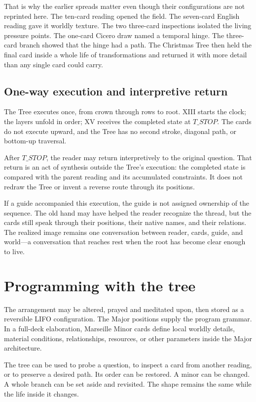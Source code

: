 That is why the earlier spreads matter even though their configurations are not
reprinted here. The ten-card reading opened the field. The seven-card English
reading gave it worldly texture. The two three-card inspections isolated the
living pressure points. The one-card Cicero draw named a temporal hinge. The
three-card branch showed that the hinge had a path. The Christmas Tree then
held the final card inside a whole life of transformations and returned it with
more detail than any single card could carry.

\subsection{One-way execution and interpretive return}

The Tree executes once, from crown through rows to root. XIII starts the clock;
the layers unfold in order; XV receives the completed state at $T\_STOP$. The
cards do not execute upward, and the Tree has no second stroke, diagonal path,
or bottom-up traversal.

After $T\_STOP$, the reader may return interpretively to the original question.
That return is an act of synthesis outside the Tree's execution: the completed
state is compared with the parent reading and its accumulated constraints. It
does not redraw the Tree or invent a reverse route through its positions.

If a guide accompanied this execution, the guide is not assigned ownership of
the sequence. The old hand may have helped the reader recognize the thread, but
the cards still speak through their positions, their native names, and their
relations. The realized image remains one conversation between reader, cards,
guide, and world—a conversation that reaches rest when the root has become
clear enough to live.

\section{Programming with the tree}

The arrangement may be altered, prayed and meditated upon, then stored as a
reversible LIFO configuration. The Major positions supply the program grammar.
In a full-deck elaboration, Marseille Minor cards define local worldly details,
material conditions, relationships, resources, or other parameters inside the
Major architecture.

The tree can be used to probe a question, to inspect a card from another
reading, or to preserve a desired path. Its order can be restored. A minor can
be changed. A whole branch can be set aside and revisited. The shape remains
the same while the life inside it changes.

